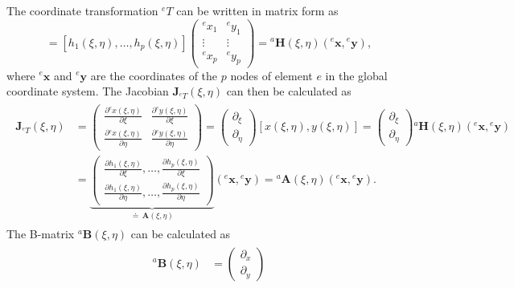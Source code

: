 \documentclass[a4paper,11pt]{article}
\numberwithin{equation}{section}
\newcommand\matr[1]{\ensuremath{\boldsymbol{\mathbf{#1}}}}
\newcommand\vect[1]{\ensuremath{\bm{#1}}}
\begin{document}
{The coordinate transformation ${}^e T$ can be written in matrix form as \begin{equation}
	[x(\xi,\eta),y(\xi,\eta)] = [h_1(\xi,\eta),\dots,h_p(\xi,\eta)]\begin{pmatrix}
		{}^e x_1  & {}^e y_1 \\
		\vdots & \vdots \\
		{}^e x_p & {}^e y_p
	\end{pmatrix} = {}^a \vect{H}(\xi,\eta)({}^e \vect{x}, {}^e \vect{y}),
\end{equation} where ${}^e \vect{x}$ and ${}^e \vect{y}$ are the coordinates of the $p$ nodes of element $e$ in the global coordinate system. The Jacobian $\matr{J}_{{}^e T}(\xi,\eta)$ can then be calculated as \begin{align}\begin{aligned}
		\matr{J}_{{}^e T}(\xi,\eta) &= \begin{pmatrix}
			\frac{\partial {}^e x(\xi,\eta)}{\partial \xi} & \frac{\partial {}^e y(\xi,\eta)}{\partial \xi}\\
			\frac{\partial {}^e x(\xi,\eta)}{\partial \eta} & \frac{\partial {}^e y(\xi,\eta)}{\partial \eta}
		\end{pmatrix} = \begin{pmatrix}
			\partial_\xi \\ \partial_\eta
		\end{pmatrix} [x(\xi,\eta), y(\xi,\eta)] =  \begin{pmatrix}
			\partial_\xi \\ \partial_\eta
		\end{pmatrix}{}^a \vect{H}(\xi,\eta)({}^e \vect{x}, {}^e \vect{y}) \\
		&= \underbrace{\begin{pmatrix}
				\frac{\partial h_1(\xi,\eta)}{\partial \xi},\dots,\frac{\partial h_p(\xi,\eta)}{\partial \xi} \\
				\frac{\partial h_1(\xi,\eta)}{\partial \eta},\dots,\frac{\partial h_p(\xi,\eta)}{\partial \eta}
		\end{pmatrix}}_{\doteq \,\matr{A}(\xi,\eta)}({}^e \vect{x}, {}^e \vect{y}) = {}^a\matr{A}(\xi,\eta)({}^e \vect{x}, {}^e \vect{y}).
\end{aligned}\end{align} The B-matrix ${}^a\matr{B}(\xi,\eta)$ can be calculated as \begin{align}\begin{aligned}
		{}^a\matr{B}(\xi,\eta) &= \begin{pmatrix}
			\partial_x \\ \partial_y

\end{pmatrix}
\end{aligned}
\end{align}}
\end{document}
